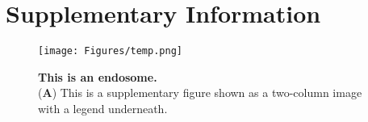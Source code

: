 
\onecolumn %
\fancyhead{} %
\renewcommand{\floatpagefraction}{0.1}
\lfoot[\bSupInf]{\dAuthor}
\rfoot[\dAuthor]{\cSupInf}
\newpage

\captionsetup*{format=largeformat} %
\setcounter{figure}{0} %
\setcounter{equation}{0} %
\makeatletter
\renewcommand{\thefigure}{S\@arabic\c@figure} %
\makeatother
\def\theequation{S\arabic{equation}}


\newpage
\section*{Supplementary Information}\label{sec:supplementary-information}

\begin{figure*}[!ht]
	\centering
	\texttt{[image: Figures/temp.png]}
	\caption{\textbf{This is an endosome.}\\
		(\textbf{A}) This is a supplementary figure shown as a two-column image with a legend underneath.}
	\label{suppfig:endosome}
\end{figure*}


























